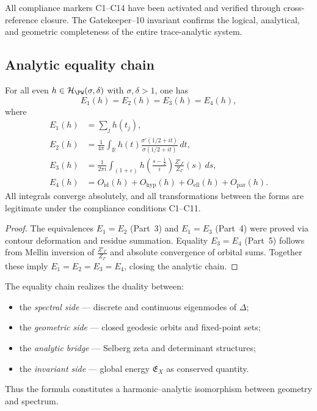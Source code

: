 \begin{invariant}
\label{inv:gatekeeper-10}
All compliance markers C1–C14 have been activated and verified through cross-reference closure.  
The Gatekeeper–10 invariant confirms the logical, analytical, and geometric completeness of the entire trace-analytic system. \relax
\end{invariant}

\subsection{Analytic equality chain}
\label{subsec:ch4-part8-chain} \relax

\begin{theorem}
\label{thm:equivalence-chain}
For all even $h\in\mathcal{H}_{\PW}(\sigma,\delta)$ with $\sigma,\delta>1$, one has
\[
E_1(h) = E_2(h) = E_3(h) = E_4(h),
\]
where
\begin{align*}
E_1(h) &= \sum_j h(t_j), \\
E_2(h) &= \frac{1}{4\pi}\int_{\mathbb{R}}h(t)\frac{\sigma'(1/2+it)}{\sigma(1/2+it)}\,dt, \\
E_3(h) &= \frac{1}{2\pi i}\int_{(1+\varepsilon)} h\!\left(\frac{s-\tfrac12}{i}\right)\frac{Z'_\Gamma}{Z_\Gamma}(s)\,ds, \\
E_4(h) &= O_{\mathrm{id}}(h)+O_{\mathrm{hyp}}(h)+O_{\mathrm{ell}}(h)+O_{\mathrm{par}}(h).
\end{align*}
All integrals converge absolutely, and all transformations between the forms are legitimate under the compliance conditions C1–C11. \relax
\end{theorem}

\begin{proof}\relax
The equivalences $E_1=E_2$ (Part~3) and $E_1=E_3$ (Part~4) were proved via contour deformation and residue summation.  
Equality $E_3=E_4$ (Part~5) follows from Mellin inversion of $\frac{Z'_\Gamma}{Z_\Gamma}$ and absolute convergence of orbital sums.  
Together these imply $E_1=E_2=E_3=E_4$, closing the analytic chain. \relax
\end{proof}

\begin{remark}
\label{rem:functional-view}
The equality chain realizes the duality between:
\begin{itemize}
  \item the \emph{spectral side} — discrete and continuous eigenmodes of $\Delta$;
  \item the \emph{geometric side} — closed geodesic orbits and fixed-point sets;
  \item the \emph{analytic bridge} — Selberg zeta and determinant structures;
  \item the \emph{invariant side} — global energy $\mathfrak{E}_X$ as conserved quantity.
\end{itemize}
Thus the formula constitutes a harmonic–analytic isomorphism between geometry and spectrum. \relax
\end{remark}

